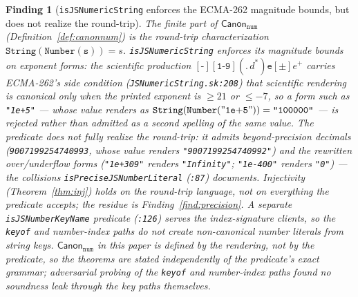 \documentclass[11pt]{article}
\newtheorem{finding}[theorem]{Finding}
\newcommand{\Canon}[1]{\mathsf{Canon}_{\texttt{#1}}}
\begin{document}
\begin{finding}[\texttt{isJSNumericString} enforces the ECMA-262
magnitude bounds, but does not realize the round-trip]
\label{find:jsnum}
The finite part of $\Canon{num}$ (Definition~\ref{def:canonnum}) is the
round-trip characterization $\mathtt{String(Number(s))} = s$.
\texttt{isJSNumericString} enforces its \emph{magnitude bounds} on
exponent forms: the scientific production
$[\texttt{-}][\texttt{1-9}](.\,d^{*})\texttt{e}[\pm]e^{+}$ carries
ECMA-262's side condition (\texttt{JSNumericString.sk:208}) that
scientific rendering is canonical only when the printed exponent is
$\geq 21$ or $\leq -7$, so a form such as \texttt{"1e+5"} --- whose value
renders as $\mathtt{String(Number("1e{+}5"))} = \texttt{"100000"}$ ---
is rejected rather than admitted as a second spelling of the same value.
The predicate does \emph{not} fully realize the round-trip: it admits
beyond-precision decimals (\texttt{9007199254740993}, whose value renders
\texttt{"9007199254740992"}) and the rewritten over/underflow forms
(\texttt{"1e+309"} renders \texttt{"Infinity"}; \texttt{"1e-400"} renders
\texttt{"0"}) --- the collisions
\texttt{isPreciseJSNumberLiteral} (\texttt{:87}) documents. Injectivity
(Theorem~\ref{thm:inj}) holds on the round-trip language, not on
everything the predicate accepts; the residue is
Finding~\ref{find:precision}. A separate \texttt{isJSNumberKeyName}
predicate (\texttt{:126}) serves the index-signature clients, so the
\texttt{keyof} and number-index paths do not create non-canonical number
literals from string keys. $\Canon{num}$ in this paper is defined by the
rendering, not by the predicate, so the theorems are stated
independently of the predicate's exact grammar; adversarial probing of
the \texttt{keyof} and number-index paths found \emph{no soundness leak}
through the key paths themselves.
\end{finding}
\end{document}

